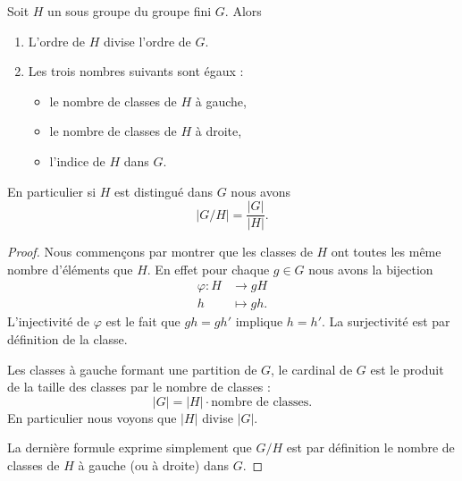 \begin{theorem}      \label{ThoLagrange}
    Soit \( H\) un sous groupe du groupe fini \( G\).  Alors
    \begin{enumerate}
        \item
    L'ordre de \( H\) divise l'ordre de \( G\).
\item 
    Les trois nombres suivants sont égaux :
    \begin{itemize}
        \item
            le nombre de classes de \( H\) à gauche,
        \item
            le nombre de classes de \( H\) à droite,
        \item
            l'indice de \( H\) dans \( G\).
    \end{itemize}
    \end{enumerate}
    En particulier si \( H\) est distingué dans \( G\) nous avons
    \begin{equation}
        | G/H |=\frac{ | G | }{ | H | }.
    \end{equation}
\end{theorem}

\begin{proof}
    Nous commençons par montrer que les classes de \( H\) ont toutes les même nombre d'éléments que \( H\). En effet pour chaque \( g\in G\) nous avons la bijection
    \begin{equation}
        \begin{aligned}
            \varphi\colon H&\to gH \\
            h&\mapsto gh. 
        \end{aligned}
    \end{equation}
    L'injectivité de \( \varphi\) est le fait que \( gh=gh'\) implique \( h=h'\). La surjectivité est par définition de la classe. 

    Les classes à gauche formant une partition de \( G\), le cardinal de \( G\) est le produit de la taille des classes par le nombre de classes :
    \begin{equation}
        | G |=| H |\cdot\text{nombre de classes}.
    \end{equation}
    En particulier nous voyons que \( | H |\) divise \( | G |\).

    La dernière formule exprime simplement que \( G/H\) est par définition le nombre de classes de \( H\) à gauche (ou à droite) dans \( G\).
\end{proof}

